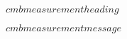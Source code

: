 
\begin{minipage}{\textwidth}
\begin{center}
    \textbf{\emph{$cmbmeasurementheading$}}
\end{center}

$cmbmeasurementmessage$

\end{minipage}
